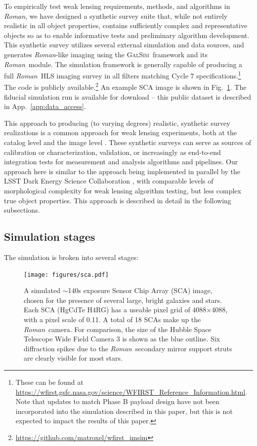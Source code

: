 \documentclass[usenatbib]{mnras}
\newcommand{\galsim}{\textsc{GalSim}}
\newcommand{\wfirst}{{\slshape Roman}}
\begin{document}
To empirically test weak lensing requirements, methods, and algorithms in \wfirst, we have designed a synthetic survey suite that, while not entirely realistic in all object properties, contains sufficiently complex and representative objects so as to enable informative tests and preliminary algorithm development. 
This synthetic survey utilizes several external simulation and data sources, and generates \wfirst-like imaging using the \galsim\ framework and its \wfirst\ module. 
The simulation framework is generally capable of producing a full \wfirst\ HLS imaging survey in all filters matching Cycle 7 specifications.\footnote{These can be found at \url{https://wfirst.gsfc.nasa.gov/science/WFIRST_Reference_Information.html}. Note that updates to match Phase B payload design have not been incorporated into the simulation described in this paper, but this is not expected to impact the results of this paper.} 
The code is publicly available.\footnote{\url{https://github.com/matroxel/wfirst_imsim}} An example SCA image is shown in Fig.~\ref{fig:sca}. The fiducial simulation run is available for download -- this public dataset is described in App.~\ref{app:data_access}.

This approach to producing (to varying degrees) realistic, synthetic survey realizations is a common approach for weak lensing experiments, both at the catalog level \citep{2018MNRAS.480.4614M,2019arXiv190706530K} and the image level \citep{2016MNRAS.457..786S,2017MNRAS.467.1627F,2018MNRAS.481.3170M,2018MNRAS.475.4524S}. These synthetic surveys can serve as sources of calibration or characterization, validation, or increasingly as end-to-end integration tests for measurement and analysis algorithms and pipelines. Our approach here is similar to the approach being implemented in parallel by the LSST Dark Energy Science Collaboration \citep[DESC;][]{2019arXiv190706530K,dc2all}, with comparable levels of morphological complexity for weak lensing algorithm testing, but less complex true object properties. This approach is described in detail in the following subsections.

\subsection{Simulation stages}\label{stages}

The simulation is broken into several stages:


\begin{figure}
\begin{center}
\texttt{[image: figures/sca.pdf]}
\end{center}
\caption[]{
A simulated $\sim$140s exposure Sensor Chip Array (SCA) image, chosen for the presence of several large, bright galaxies and stars. Each SCA (HgCdTe H4RG) has a useable pixel grid of 4088$\times$4088, with a pixel scale of 0.11\arcsec. A total of 18 SCAs make up the \wfirst\ camera. For comparison, the size of the Hubble Space Telescope Wide Field Camera 3 is shown as the blue outline. Six diffraction spikes due to the \wfirst\ secondary mirror support struts are clearly visible for most stars.
\label{fig:sca}}
\end{figure}
\end{document}
